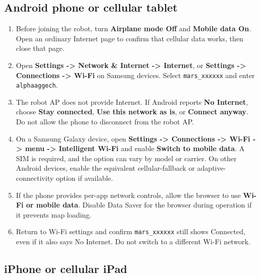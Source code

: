 \documentclass[
  10pt,
  letterpaper,
  openany]{report}
\providecommand{\tightlist}{%
  \setlength{\itemsep}{0pt}\setlength{\parskip}{0pt}}
\begin{document}
\subsection{Android phone or cellular
tablet}\label{android-phone-or-cellular-tablet}

\begin{enumerate}
\tightlist
\item
  Before joining the robot, turn \textbf{Airplane mode Off} and
  \textbf{Mobile data On}. Open an ordinary Internet page to confirm
  that cellular data works, then close that page.
\item
  Open \textbf{Settings -\textgreater{} Network \& Internet
  -\textgreater{} Internet}, or \textbf{Settings -\textgreater{}
  Connections -\textgreater{} Wi-Fi} on Samsung devices. Select
  \texttt{mars\_xxxxxx} and enter \texttt{alphaaggech}.
\item
  The robot AP does not provide Internet. If Android reports \textbf{No
  Internet}, choose \textbf{Stay connected}, \textbf{Use this network as
  is}, or \textbf{Connect anyway}. Do not allow the phone to disconnect
  from the robot AP.
\item
  On a Samsung Galaxy device, open \textbf{Settings -\textgreater{}
  Connections -\textgreater{} Wi-Fi -\textgreater{} menu -\textgreater{}
  Intelligent Wi-Fi} and enable \textbf{Switch to mobile data}. A SIM is
  required, and the option can vary by model or carrier. On other
  Android devices, enable the equivalent cellular-fallback or
  adaptive-connectivity option if available.
\item
  If the phone provides per-app network controls, allow the browser to
  use \textbf{Wi-Fi or mobile data}. Disable Data Saver for the browser
  during operation if it prevents map loading.
\item
  Return to Wi-Fi settings and confirm \texttt{mars\_xxxxxx} still shows
  Connected, even if it also says No Internet. Do not switch to a
  different Wi-Fi network.
\end{enumerate}

\subsection{iPhone or cellular iPad}\label{iphone-or-cellular-ipad}
\end{document}
